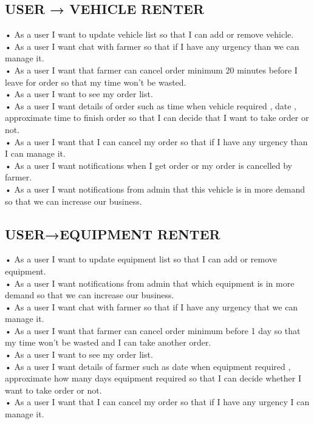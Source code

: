 \documentclass[conference]{IEEEtran}
\begin{document}
\subsection{ USER → VEHICLE RENTER}
• As a user I want to update vehicle list so that I can add or remove vehicle.\\
• As a user I want chat with farmer so that if I have any urgency than we can manage it.\\
• As a user I want that farmer can cancel order minimum 20 minutes before I leave for order so that my time won’t be wasted.\\
• As a user I want to see my order list.\\
• As a user I want details of order such as time when vehicle required , date , 
approximate time to finish order so that I can decide that I want to take order or not.\\
• As a user I want that I can cancel my order so that if I have any urgency than I can manage it.\\
• As a user I want notifications when I get order or my order is cancelled by farmer.\\
• As a user I want notifications from admin that this vehicle is in more demand so that we can increase our business.\\
\subsection{USER→EQUIPMENT RENTER}
• As a user I want to update equipment list so that I can add or remove equipment.\\
• As a user I want notifications from admin that which equipment is in more demand so that we can increase our business.\\
• As a user I want chat with farmer so that if I have any urgency that we can manage it.\\
• As a user I want that farmer can cancel order minimum before 1 day so that my 
time won’t be wasted and I can take another order.\\
• As a user I want to see my order list.\\
• As a user I want details of farmer such as date when equipment required , 
approximate how many days equipment required so that I can decide whether I
want to take order or not.\\
• As a user I want that I can cancel my order so that if I have any urgency I can manage it.\\
\end{document}
